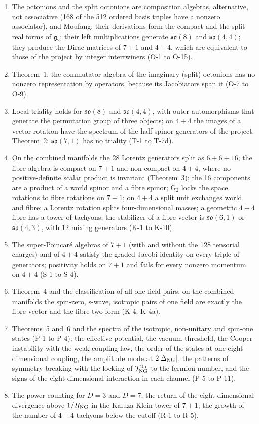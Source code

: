 \begin{enumerate}
\item The octonions and the split octonions are composition algebras, alternative, not associative
(168 of the 512 ordered basis triples have a nonzero associator), and Moufang; their derivations form
the compact and the split real forms of $\mathfrak g_2$; their left multiplications generate
$\mathfrak{so}(8)$ and $\mathfrak{so}(4,4)$; they produce the Dirac matrices of $7+1$ and $4+4$, which are
equivalent to those of the project by integer intertwiners (O-1 to O-15).
\item Theorem~1: the commutator algebra of the imaginary (split) octonions has no nonzero
representation by operators, because its Jacobiators span it (O-7 to O-9).
\item Local triality holds for $\mathfrak{so}(8)$ and $\mathfrak{so}(4,4)$, with outer automorphisms that
generate the permutation group of three objects; on $4+4$ the images of a vector rotation have the
spectrum of the half-spinor generators of the project. Theorem~2: $\mathfrak{so}(7,1)$ has no triality (T-1
to T-7d).
\item On the combined manifolds the 28 Lorentz generators split as $6+6+16$; the fibre algebra is
compact on $7+1$ and non-compact on $4+4$, where no positive-definite scalar product is invariant
(Theorem~3); the 16 components are a product of a world spinor and a fibre spinor; $\mathrm G_2$ locks the
space rotations to fibre rotations on $7+1$; on $4+4$ a split unit exchanges world and fibre; a Lorentz
rotation splits four-dimensional masses; a geometric $4+4$ fibre has a tower of tachyons; the
stabilizer of a fibre vector is $\mathfrak{so}(6,1)$ or $\mathfrak{so}(4,3)$, with 12 mixing generators (K-1 to
K-10).
\item The super-Poincar\'e algebras of $7+1$ (with and without the 128 tensorial charges) and of $4+4$
satisfy the graded Jacobi identity on every triple of generators; positivity holds on $7+1$ and fails
for every nonzero momentum on $4+4$ (S-1 to S-4).
\item Theorem~4 and the classification of all one-field pairs: on the combined manifolds the
spin-zero, s-wave, isotropic pairs of one field are exactly the fibre vector and the fibre two-form
(K-4, K-4a).
\item Theorems~5 and~6 and the spectra of the isotropic, non-unitary and spin-one states (P-1 to P-4);
the effective potential, the vacuum threshold, the Cooper instability with the weak-coupling law, the
order of the states at one eight-dimensional coupling, the amplitude mode at $2\lvert\Delta_{\rm NG}\rvert$,
the patterns of symmetry breaking with the locking of $\mathcal T^{05}_{\rm NG}$ to the fermion number, and
the signs of the eight-dimensional interaction in each channel (P-5 to P-11).
\item The power counting for $D=3$ and $D=7$; the return of the eight-dimensional divergence above
$1/R_{\rm NG}$ in the Kaluza-Klein tower of $7+1$; the growth of the number of $4+4$ tachyons below the
cutoff (R-1 to R-5).
\end{enumerate}

